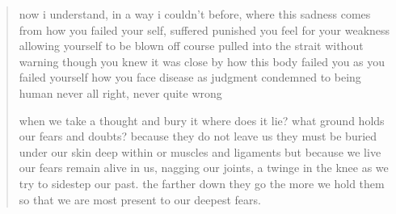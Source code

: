 \begin{verse}
now i understand, in a way i couldn't before,
where this sadness comes from
how you failed your self, suffered
punished you feel for your weakness
allowing yourself to be blown off course
pulled into the strait without warning
though you knew it was close by
how this body failed you
as you failed yourself
how you face disease as judgment
condemned to being human
never all right, never quite wrong

when we take a thought and bury it
where does it lie? 
what ground holds our fears and doubts?
because they do not leave us
they must be buried under our skin
deep within or muscles and ligaments
but because we live our fears remain
alive in us, nagging our joints,
a twinge in the knee as we try to 
sidestep our past. the farther down they go
the more we hold them so that we are
most present to our deepest fears.

\end{verse}
